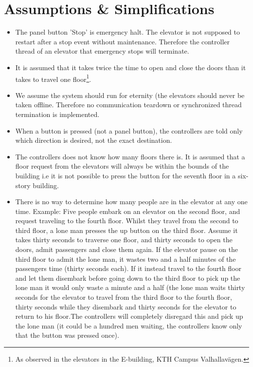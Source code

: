 \section{Assumptions \& Simplifications}
\begin{itemize}
\item The panel button 'Stop' is emergency halt. The elevator is not supposed to restart after a stop event without maintenance. Therefore the controller thread of an elevator that emergency stops will terminate.
\item It is assumed that it takes twice the time to open and close the doors than it takes to travel one floor\footnote{As observed in the elevators in the E-building, KTH Campus Valhallavägen.}.
\item We assume the system should run for eternity (the elevators should never be taken offline. Therefore no communication teardown or synchronized thread termination is implemented. 
\item When a button is pressed (not a panel button), the controllers are told only which direction is desired, not the exact destination. 
\item The controllers does not know how many floors there is. It is assumed that a floor request from the elevators will always be within the bounds of the building i.e it is not possible to press the button for the seventh floor in a six-story building.
\item There is no way to determine how many people are in the elevator at any one time. 
Example:\newline
Five people embark on an elevator on the second floor, and request traveling to the fourth floor. Whilst they travel from the second to third floor, a lone man presses the up button on the third floor. Assume it takes thirty seconds to traverse one floor, and thirty seconds to open the doors, admit passengers and close them again. If the elevator pause on the third floor to admit the lone man, it wastes two and a half minutes of the passengers time (thirty seconds each). If it instead travel to the fourth floor and let them disembark before going down to the third floor to pick up the lone man it would only waste a minute and a half (the lone man waits thirty seconds for the elevator to travel from the third floor to the fourth floor, thirty seconds while they disembark and thirty seconds for the elevator to return to his floor.\newline The controllers will completely disregard this and pick up the lone man (it could be a hundred men waiting, the controllers know only that the button was pressed once).
\end{itemize}